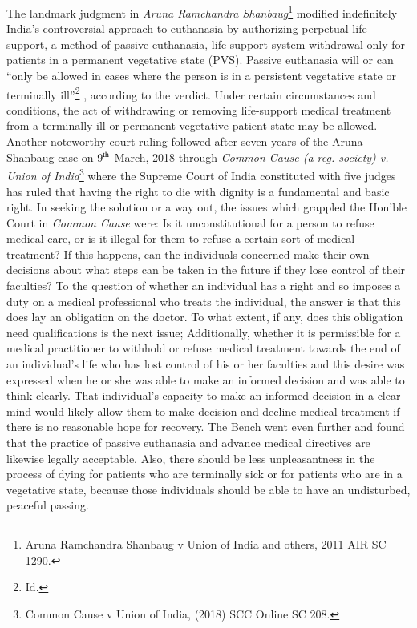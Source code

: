 \setcounter{figure}{0}
\setcounter{table}{0}
\setcounter{footnote}{0}

\label{2019-art6}

\begin{multicols}{2}


\noi
The landmark judgment in \textit{Aruna Ramchandra Shanbaug}\footnote{Aruna Ramchandra Shanbaug v Union of India and others, 2011 AIR SC 1290.} modified indefinitely India’s
controversial approach to euthanasia by authorizing perpetual life support, a method of
passive euthanasia, life support system withdrawal only for patients in a permanent
vegetative state (PVS). Passive euthanasia will or can “only be allowed in cases where the
person is in a persistent vegetative state or terminally ill”\footnote{Id.}
, according to the verdict. Under certain circumstances and conditions, the act of withdrawing or removing life-support
medical treatment from a terminally ill or permanent vegetative patient state may be allowed.
Another noteworthy court ruling followed after seven years of the Aruna Shanbaug case on
9$^{\rm th}$ March, 2018 through \textit{Common Cause (a reg. society) v. Union of India}\footnote{Common Cause v Union of India, (2018) SCC Online SC 208.}
 where the Supreme Court of India constituted with five judges has ruled that having the right to die with
dignity is a fundamental and basic right. In seeking the solution or a way out, the issues
which grappled the Hon’ble Court in \textit{Common Cause} were: Is it unconstitutional for a person
to refuse medical care, or is it illegal for them to refuse a certain sort of medical treatment? If
this happens, can the individuals concerned make their own decisions about what steps can be
taken in the future if they lose control of their faculties? To the question of whether an
individual has a right and so imposes a duty on a medical professional who treats the
individual, the answer is that this does lay an obligation on the doctor. To what extent, if any,
does this obligation need qualifications is the next issue; Additionally, whether it is
permissible for a medical practitioner to withhold or refuse medical treatment towards the
end of an individual’s life who has lost control of his or her faculties and this desire was
expressed when he or she was able to make an informed decision and was able to think
clearly. That individual’s capacity to make an informed decision in a clear mind would likely
allow them to make decision and decline medical treatment if there is no reasonable hope for
recovery. The Bench went even further and found that the practice of passive euthanasia and 
advance medical directives are likewise legally acceptable. Also, there should be less
unpleasantness in the process of dying for patients who are terminally sick or for patients
who are in a vegetative state, because those individuals should be able to have an
undisturbed, peaceful passing.


\end{multicols}
